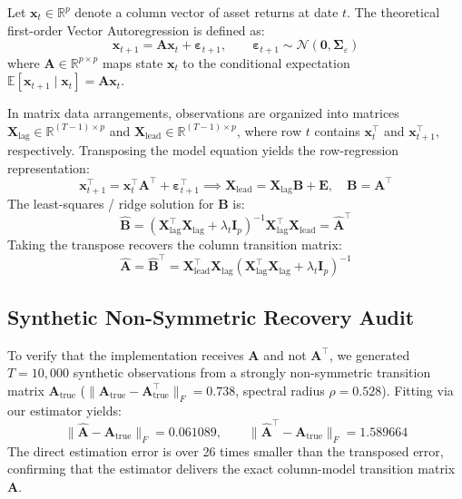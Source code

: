 \documentclass[12pt]{article}
\begin{document}
Let $\mathbf{x}_t \in \mathbb{R}^p$ denote a column vector of asset returns at date $t$. The theoretical first-order Vector Autoregression is defined as:
\begin{equation}
\mathbf{x}_{t+1} = \mathbf{A}\mathbf{x}_t + \boldsymbol{\varepsilon}_{t+1}, \qquad \boldsymbol{\varepsilon}_{t+1} \sim \mathcal{N}(\mathbf{0}, \boldsymbol{\Sigma}_\varepsilon)
\end{equation}
where $\mathbf{A} \in \mathbb{R}^{p \times p}$ maps state $\mathbf{x}_t$ to the conditional expectation $\mathbb{E}[\mathbf{x}_{t+1} \mid \mathbf{x}_t] = \mathbf{A}\mathbf{x}_t$.

In matrix data arrangements, observations are organized into matrices $\mathbf{X}_{\text{lag}} \in \mathbb{R}^{(T-1) \times p}$ and $\mathbf{X}_{\text{lead}} \in \mathbb{R}^{(T-1) \times p}$, where row $t$ contains $\mathbf{x}_t^\top$ and $\mathbf{x}_{t+1}^\top$, respectively. Transposing the model equation yields the row-regression representation:
\begin{equation}
\mathbf{x}_{t+1}^\top = \mathbf{x}_t^\top \mathbf{A}^\top + \boldsymbol{\varepsilon}_{t+1}^\top \implies \mathbf{X}_{\text{lead}} = \mathbf{X}_{\text{lag}} \mathbf{B} + \mathbf{E}, \quad \mathbf{B} = \mathbf{A}^\top
\end{equation}
The least-squares / ridge solution for $\mathbf{B}$ is:
\begin{equation}
\hat{\mathbf{B}} = \left( \mathbf{X}_{\text{lag}}^\top \mathbf{X}_{\text{lag}} + \lambda_t \mathbf{I}_p \right)^{-1} \mathbf{X}_{\text{lag}}^\top \mathbf{X}_{\text{lead}} = \hat{\mathbf{A}}^\top
\end{equation}
Taking the transpose recovers the column transition matrix:
\begin{equation}
\hat{\mathbf{A}} = \hat{\mathbf{B}}^\top = \mathbf{X}_{\text{lead}}^\top \mathbf{X}_{\text{lag}} \left( \mathbf{X}_{\text{lag}}^\top \mathbf{X}_{\text{lag}} + \lambda_t \mathbf{I}_p \right)^{-1}
\end{equation}

\subsection{Synthetic Non-Symmetric Recovery Audit}
To verify that the implementation receives $\mathbf{A}$ and not $\mathbf{A}^\top$, we generated $T=10,000$ synthetic observations from a strongly non-symmetric transition matrix $\mathbf{A}_{\text{true}}$ ($\|\mathbf{A}_{\text{true}} - \mathbf{A}_{\text{true}}^\top\|_F = 0.738$, spectral radius $\rho = 0.528$). Fitting via our estimator yields:
\begin{equation}
\|\hat{\mathbf{A}} - \mathbf{A}_{\text{true}}\|_F = 0.061089, \qquad \|\hat{\mathbf{A}}^\top - \mathbf{A}_{\text{true}}\|_F = 1.589664
\end{equation}
The direct estimation error is over 26 times smaller than the transposed error, confirming that the estimator delivers the exact column-model transition matrix $\mathbf{A}$.
\end{document}
